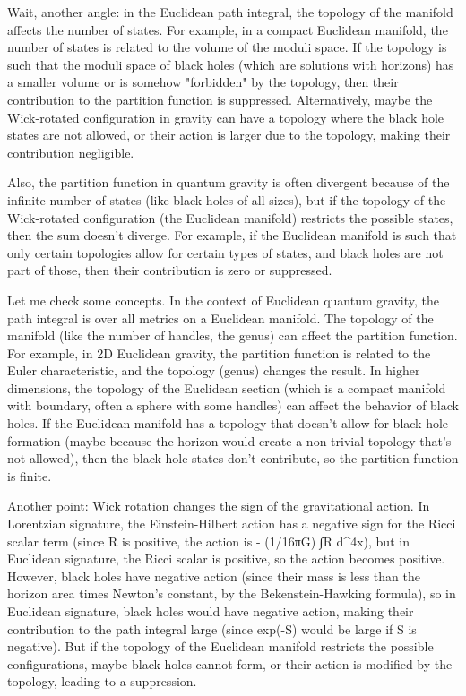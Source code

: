 Wait, another angle: in the Euclidean path integral, the topology of the manifold affects the number of states. For example, in a compact Euclidean manifold, the number of states is related to the volume of the moduli space. If the topology is such that the moduli space of black holes (which are solutions with horizons) has a smaller volume or is somehow "forbidden" by the topology, then their contribution to the partition function is suppressed. Alternatively, maybe the Wick-rotated configuration in gravity can have a topology where the black hole states are not allowed, or their action is larger due to the topology, making their contribution negligible.

Also, the partition function in quantum gravity is often divergent because of the infinite number of states (like black holes of all sizes), but if the topology of the Wick-rotated configuration (the Euclidean manifold) restricts the possible states, then the sum doesn't diverge. For example, if the Euclidean manifold is such that only certain topologies allow for certain types of states, and black holes are not part of those, then their contribution is zero or suppressed.

Let me check some concepts. In the context of Euclidean quantum gravity, the path integral is over all metrics on a Euclidean manifold. The topology of the manifold (like the number of handles, the genus) can affect the partition function. For example, in 2D Euclidean gravity, the partition function is related to the Euler characteristic, and the topology (genus) changes the result. In higher dimensions, the topology of the Euclidean section (which is a compact manifold with boundary, often a sphere with some handles) can affect the behavior of black holes. If the Euclidean manifold has a topology that doesn't allow for black hole formation (maybe because the horizon would create a non-trivial topology that's not allowed), then the black hole states don't contribute, so the partition function is finite.

Another point: Wick rotation changes the sign of the gravitational action. In Lorentzian signature, the Einstein-Hilbert action has a negative sign for the Ricci scalar term (since R is positive, the action is - (1/16πG) ∫R d^4x), but in Euclidean signature, the Ricci scalar is positive, so the action becomes positive. However, black holes have negative action (since their mass is less than the horizon area times Newton's constant, by the Bekenstein-Hawking formula), so in Euclidean signature, black holes would have negative action, making their contribution to the path integral large (since exp(-S) would be large if S is negative). But if the topology of the Euclidean manifold restricts the possible configurations, maybe black holes cannot form, or their action is modified by the topology, leading to a suppression.

